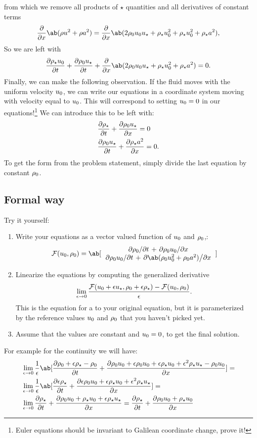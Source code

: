 \documentclass[justified, nobib,a4paper]{tufte-handout}
\begin{document}
from which we remove all products of \(\star\) quantities and all derivatives of constant terms
\[
	\pdv{}{x}\ab(\rho u^2 + \rho a^2) =
	\pdv{}{x}\ab(  2\rz\uz\us + \rs\uz^2 + \rs\uz^2  + \rs a^2),
\]
So we are left with
\[
	\pdv{\rs \uz}{t} + \pdv{\rz \us}{t} + \pdv{}{x}\ab(  2\rz\uz\us + \rs\uz^2 + \rs a^2) = 0.
\]
Finally, we can make the following observation. If the fluid moves with the
uniform velocity \(u_0\), we can write our equations in a coordinate system
moving with velocity equal to \(u_0\). This will correspond to setting \(u_0=0\)
in our equations!\footnote{Euler equations should be invariant to Galilean
	coordinate change, prove it!} We can introduce this to be left with:
\[
	\begin{split}
		 & \pdv{\rho_\star}{t} + \pdv{\rho_0u_\star}{x} = 0     \\
		 & \pdv{\rho_0u_\star}{t} + \pdv{\rho_\star a^2}{x} = 0.
	\end{split}
\]
To get the form from the problem statement, simply divide the last equation by constant \(\rho_0\).

\subsection{Formal way}
Try it yourself:
\begin{enumerate}
	\item Write your equations as a vector valued function of \(u_0\) and \(\rho_0\),:
	      \[
		      \mathcal{F}(\uz, \rz) = \ab[
			      \begin{array}{c}
				      \pdv{\rz}/{t} + \pdv{\rz \uz}/{x} \\
				      \pdv{\rz \uz}/{t} + \pdv{\ab(\rz \uz^2 +\rz a^2 )}/{x}
			      \end{array}
		      ]
	      \]
	\item Linearize the equations by computing the generalized derivative
	      \[
		      \lim_{\epsilon \to 0} \frac{
			      \mathcal{F}(u_0 + \epsilon u_\star, \rho_0 + \epsilon \rho_\star)
			      - \mathcal{F}(u_0, \rho_0)}{\epsilon}.
	      \]
	      This is the equation for a  to your original equation, but it is parameterized
	      by the reference values \(u_0\) and \(\rho_0\) that you haven't picked yet.
	\item Assume that the values are constant and \(u_0=0\), to get the final solution.
\end{enumerate}
For example for the continuity we will have:
\[
	\begin{split}
		 & \lim_{\epsilon \to 0}\frac{1}{\epsilon}\ab[
		\pdv{\rz + \epsilon \rs - \rz}{t} + \pdv{\rz \uz + \epsilon\rz\uz + \epsilon \rs \uz + \epsilon^2\rs\us - \rz\uz }{x}]=           \\
		 & \lim_{\epsilon \to 0}\frac{1}{\epsilon}\ab[
		\pdv{ \epsilon \rs}{t} + \pdv{ \epsilon\rz\uz + \epsilon \rs \uz + \epsilon^2\rs\us }{x}] =                                       \\
		 & \lim_{\epsilon \to 0}\pdv{ \rs}{t} + \pdv{ \rz\uz + \rs \uz + \epsilon\rs\us }{x} =\pdv{ \rs}{t} + \pdv{ \rz\uz + \rs \uz }{x}
	\end{split}
\]
\end{document}
